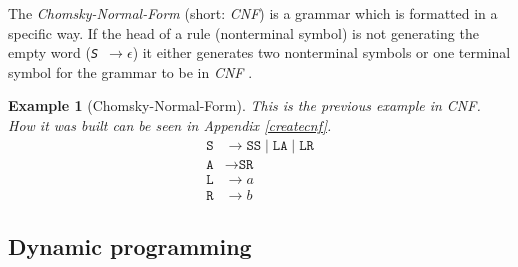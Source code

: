 \documentclass[a4paper, 11pt]{article}
\newtheorem*{example*}{Example}
\begin{document}
The \textit{Chomsky-Normal-Form} (short: \textit{CNF}) is a grammar which is formatted in a specific way. If the head of a rule (nonterminal symbol) is not generating the empty word (\textit{\texttt{S $\rightarrow \epsilon$}}) it either generates two nonterminal symbols or one terminal symbol for the grammar to be in \textit{CNF} \cite{CNF}.


\begin{example*}[Chomsky-Normal-Form]
This is the previous example in CNF. How it was built can be seen in Appendix \ref{createcnf}.
\begin{align*}
\texttt{S} & \rightarrow \texttt{SS} \mid  \texttt{LA} \mid \texttt{LR} \\
\texttt{A} & \rightarrow \texttt{SR} \\
\texttt{L} & \rightarrow a \\
\texttt{R} & \rightarrow b
\end{align*}
\end{example*}



\subsection{Dynamic programming}
\label{dp}
\end{document}
